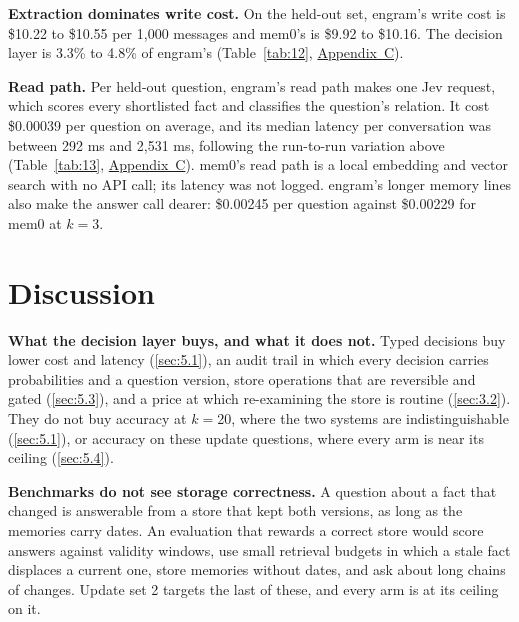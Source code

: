 \documentclass[11pt]{article}
\newcommand{\src}[1]{}
\begin{document}
\textbf{Extraction dominates write cost.} On the held-out set, engram's write cost is \$10.22\src{bench/results/heldout\_report.json} to \$10.55\src{bench/results/heldout\_report.json} per 1,000 messages and mem0's is \$9.92\src{bench/results/heldout\_report.json} to \$10.16\src{bench/results/heldout\_report.json}. The decision layer is 3.3\%\src{bench/results/heldout\_report.json: decision $/1k ÷ write $/1k} to 4.8\%\src{bench/results/heldout\_report.json: decision $/1k ÷ write $/1k} of engram's (Table~\ref{tab:12}, \hyperref[app:C]{Appendix~C}).

\textbf{Read path.} Per held-out question, engram's read path makes one Jev request, which scores every shortlisted fact and classifies the question's relation. It cost \$0.00039\src{bench/results/read\_path.json} per question on average, and its median latency per conversation was between 292 ms\src{bench/results/read\_path.json} and 2,531 ms\src{bench/results/read\_path.json}, following the run-to-run variation above (Table~\ref{tab:13}, \hyperref[app:C]{Appendix~C}). mem0's read path is a local embedding and vector search with no API call; its latency was not logged. engram's longer memory lines also make the answer call dearer: \$0.00245\src{bench/results/read\_path.json} per question against \$0.00229\src{bench/results/read\_path.json} for mem0 at $k{=}$3.

\section{Discussion}\label{sec:6}
\textbf{What the decision layer buys, and what it does not.} Typed decisions buy lower cost and latency (\cref{sec:5.1}), an audit trail in which every decision carries probabilities and a question version, store operations that are reversible and gated (\cref{sec:5.3}), and a price at which re-examining the store is routine (\cref{sec:3.2}). They do not buy accuracy at $k{=}$20, where the two systems are indistinguishable (\cref{sec:5.1}), or accuracy on these update questions, where every arm is near its ceiling (\cref{sec:5.4}).

\textbf{Benchmarks do not see storage correctness.} A question about a fact that changed is answerable from a store that kept both versions, as long as the memories carry dates. An evaluation that rewards a correct store would score answers against validity windows, use small retrieval budgets in which a stale fact displaces a current one, store memories without dates, and ask about long chains of changes. Update set 2 targets the last of these, and every arm is at its ceiling on it.
\end{document}
